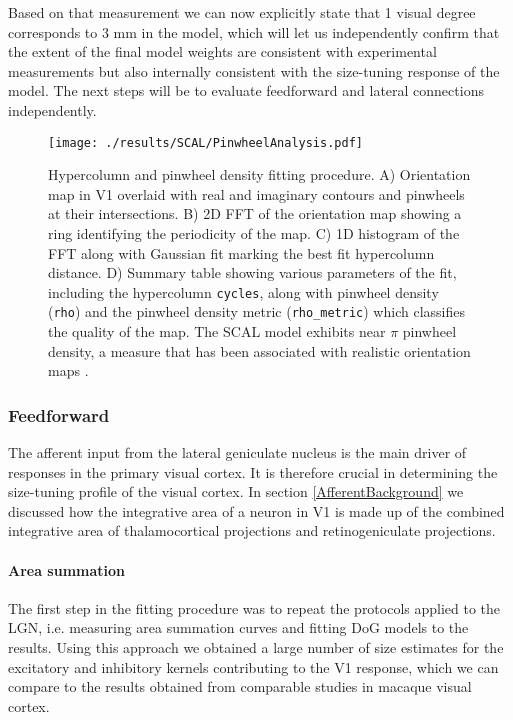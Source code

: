 Based on that measurement we can now explicitly state that 1 visual
degree corresponds to 3 mm in the model, which will let us
independently confirm that the extent of the final model weights are
consistent with experimental measurements but also internally
consistent with the size-tuning response of the model. The next steps
will be to evaluate feedforward and lateral connections independently.

\begin{figure}
	\centering
        \texttt{[image: ./results/SCAL/PinwheelAnalysis.pdf]}
	\caption[Hypercolumn and pinwheel density fitting procedure and
      results.]{Hypercolumn and pinwheel density fitting procedure. A)
      Orientation map in V1 overlaid with real and imaginary contours
      and pinwheels at their intersections. B) 2D FFT of the
      orientation map showing a ring identifying the periodicity of
      the map. C) 1D histogram of the FFT along with Gaussian fit
      marking the best fit hypercolumn distance. D) Summary table
      showing various parameters of the fit, including the hypercolumn
      \texttt{cycles}, along with pinwheel density (\texttt{rho}) and
      the pinwheel density metric (\texttt{rho\_metric}) which
      classifies the quality of the map. The SCAL model exhibits near
      $\pi$ pinwheel density, a measure that has been associated with
      realistic orientation maps \citep{Kaschube2010, Stevens2013}.}
	\label{SCALhypercolumns}
\end{figure}

\subsubsection*{Feedforward}

The afferent input from the lateral geniculate nucleus is the main
driver of responses in the primary visual cortex. It is therefore
crucial in determining the size-tuning profile of the visual cortex.
In section \ref{AfferentBackground} we discussed how the integrative
area of a neuron in V1 is made up of the combined integrative area of
thalamocortical projections and retinogeniculate projections.

\paragraph{Area summation}

The first step in the fitting procedure was to repeat the protocols
applied to the LGN, i.e. measuring area summation curves and fitting
DoG models to the results. Using this approach we obtained a large
number of size estimates for the excitatory and inhibitory kernels
contributing to the V1 response, which we can compare to the results
obtained from comparable studies in macaque visual cortex.

